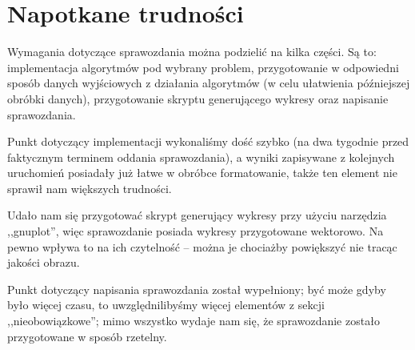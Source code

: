 \section{Napotkane trudności}
Wymagania dotyczące sprawozdania można podzielić na kilka części. Są to: implementacja algorytmów pod wybrany problem, przygotowanie w odpowiedni sposób danych wyjściowych z działania algorytmów (w celu ułatwienia późniejszej obróbki danych), przygotowanie skryptu generującego wykresy oraz napisanie sprawozdania.

Punkt dotyczący implementacji wykonaliśmy dość szybko (na dwa tygodnie przed faktycznym terminem oddania sprawozdania), a wyniki zapisywane z kolejnych uruchomień posiadały już łatwe w obróbce formatowanie, także ten element nie sprawił nam większych trudności.

Udało nam się przygotować skrypt generujący wykresy przy użyciu narzędzia ,,gnuplot'', więc sprawozdanie posiada wykresy przygotowane wektorowo. Na pewno wpływa to na ich czytelność -- można je chociażby powiększyć nie tracąc jakości obrazu.

Punkt dotyczący napisania sprawozdania został wypełniony; być może gdyby było więcej czasu, to uwzględnilibyśmy więcej elementów z sekcji ,,nieobowiązkowe''; mimo wszystko wydaje nam się, że sprawozdanie zostało przygotowane w sposób rzetelny.